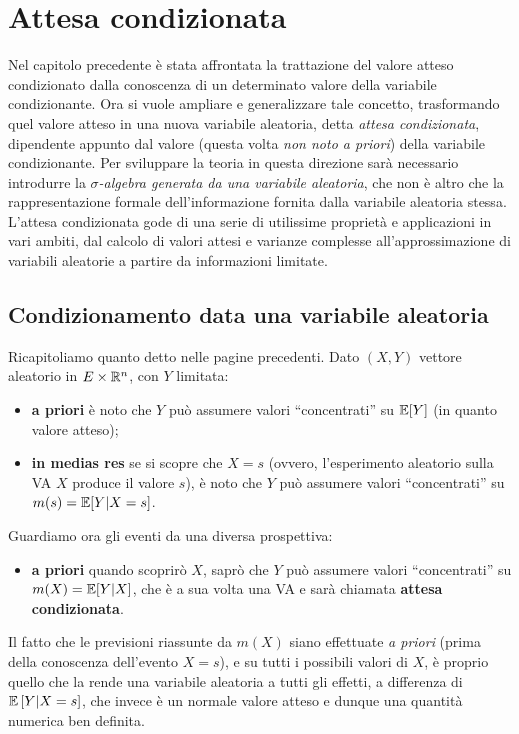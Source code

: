 \section{Attesa condizionata}
Nel capitolo precedente è stata affrontata la trattazione del valore atteso condizionato dalla conoscenza di un determinato valore della variabile condizionante.
Ora si vuole ampliare e generalizzare tale concetto, trasformando quel valore atteso in una nuova variabile aleatoria, detta \emph{attesa condizionata}, dipendente appunto dal valore (questa volta \emph{non noto a priori}) della variabile condizionante.
Per sviluppare la teoria in questa direzione sarà necessario introdurre la \emph{$\sigma$-algebra generata da una variabile aleatoria}, che non è altro che la rappresentazione formale dell'informazione fornita dalla variabile aleatoria stessa.
L'attesa condizionata gode di una serie di utilissime proprietà e applicazioni in vari ambiti, dal calcolo di valori attesi e varianze complesse all'approssimazione di variabili aleatorie a partire da informazioni limitate.

\subsection{Condizionamento data una variabile aleatoria}

Ricapitoliamo quanto detto nelle pagine precedenti.
Dato $(X, Y)$ vettore aleatorio in $E \times \mathbb R^n$, con $Y$ limitata:
\begin{itemize}
  \item \textbf{a priori} è noto che $Y$ può assumere valori ``concentrati'' su $\mathbb E[Y]$ (in quanto valore atteso);
  \item \textbf{in medias res} se si scopre che $X=s$ (ovvero, l'esperimento aleatorio sulla VA $X$ produce il valore $s$), è noto che $Y$ può assumere valori ``concentrati'' su $m(s) = \mathbb E[Y|X=s]$.
\end{itemize}
Guardiamo ora gli eventi da una diversa prospettiva:
\begin{itemize}
  \item \textbf{a priori} quando scoprirò $X$, saprò che $Y$ può assumere valori ``concentrati'' su $m(X) = \mathbb E[Y|X]$, che è a sua volta una VA e sarà chiamata \textbf{attesa condizionata}.
\end{itemize}
Il fatto che le previsioni riassunte da $m(X)$ siano effettuate \emph{a priori} (prima della conoscenza dell'evento $X = s$), e su tutti i possibili valori di $X$, è proprio quello che la rende una variabile aleatoria a tutti gli effetti, a differenza di $\mathbb E \left[ Y|X=s \right]$, che invece è un normale valore atteso e dunque una quantità numerica ben definita.

